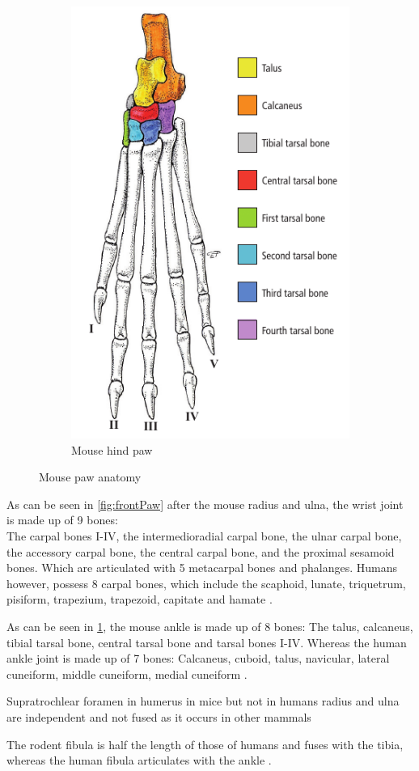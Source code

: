 \begin{figure}[h]
\begin{subfigure}{0.49\textwidth}
		\includegraphics[scale=0.5]{images/mouseHindPaw.png}
		\caption{Mouse hind paw \cite{ruberteMorphologicalMousePhenotyping2017}}\label{fig:hindPaw}
	\end{subfigure}
	\caption{Mouse paw anatomy}\label{fig:mousePaws}
\end{figure}

\noindent
As can be seen in \cref{fig:frontPaw} after the mouse radius and ulna, the wrist joint is made up of 9 bones:\\
The carpal bones I-IV, the intermedioradial carpal bone, the ulnar carpal bone, the accessory carpal bone,
the central carpal bone, and the proximal sesamoid bones.
Which are articulated with 5 metacarpal bones and phalanges.
Humans however, possess 8 carpal bones, which include the scaphoid, lunate, triquetrum, pisiform,
trapezium, trapezoid, capitate and hamate \cite{platzerTaschenatlasAnatomieBd2013}.

\noindent
As can be seen in \cref{fig:hindPaw}, the mouse ankle is made up of 8 bones:
The talus, calcaneus, tibial tarsal bone, central tarsal bone and tarsal bones I-IV.
Whereas the human ankle joint is made up of 7 bones:
Calcaneus, cuboid, talus, navicular, lateral cuneiform, middle cuneiform, medial cuneiform \cite{platzerTaschenatlasAnatomieBd2013}.

\noindent
Supratrochlear foramen in humerus in mice but not in humans \cite{ruberteMorphologicalMousePhenotyping2017,platzerTaschenatlasAnatomieBd2013}
radius and ulna are independent and not fused as it occurs in other mammals

\noindent
The rodent fibula is half the length of those of humans and fuses with the tibia,
whereas the human fibula articulates with the ankle \cite{jeromeSkeletalSystem2018,platzerTaschenatlasAnatomieBd2013}.

